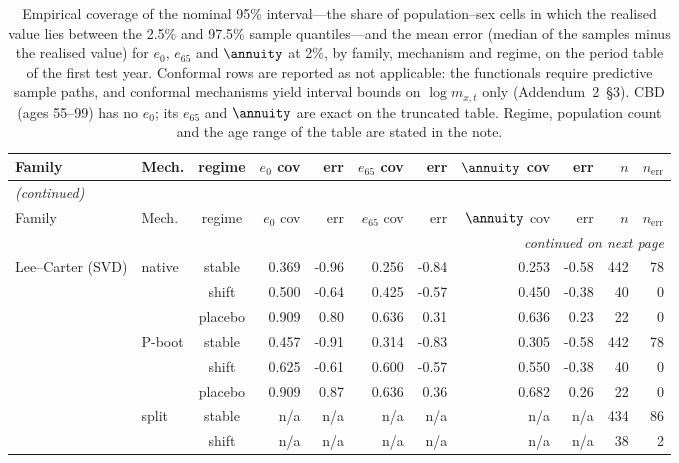 {\footnotesize\setlength{\tabcolsep}{2.5pt}
\begin{longtable}{@{}llcrrrrrrrr@{}}
\caption{Empirical coverage of the nominal 95\% interval---the share of population--sex cells in which the realised value lies between the 2.5\% and 97.5\% sample quantiles---and the mean error (median of the samples minus the realised value) for $e_0$, $e_{65}$ and $\annuity$ at 2\%, by family, mechanism and regime, on the period table of the first test year. Conformal rows are reported as not applicable: the functionals require predictive sample paths, and conformal mechanisms yield interval bounds on $\log m_{x,t}$ only (Addendum~2~\S3). CBD (ages 55--99) has no $e_0$; its $e_{65}$ and $\annuity$ are exact on the truncated table. Regime, population count and the age range of the table are stated in the note.}\label{tab:h5-actuarial} \\
\toprule
Family & Mech. & regime & $e_0$ cov & err & $e_{65}$ cov & err & $\annuity$ cov & err & $n$ & $n_{\mathrm{err}}$ \\
\midrule
\endfirsthead
\multicolumn{11}{l}{\emph{(continued)}} \\
\toprule
Family & Mech. & regime & $e_0$ cov & err & $e_{65}$ cov & err & $\annuity$ cov & err & $n$ & $n_{\mathrm{err}}$ \\
\midrule
\endhead
\midrule \multicolumn{11}{r}{\emph{continued on next page}} \\
\endfoot
\bottomrule
\endlastfoot
Lee--Carter (SVD) & native & stable & 0.369 & -0.96 & 0.256 & -0.84 & 0.253 & -0.58 & 442 & 78 \\
 &  & shift & 0.500 & -0.64 & 0.425 & -0.57 & 0.450 & -0.38 & 40 & 0 \\
 &  & placebo & 0.909 & 0.80 & 0.636 & 0.31 & 0.636 & 0.23 & 22 & 0 \\
 & P-boot & stable & 0.457 & -0.91 & 0.314 & -0.83 & 0.305 & -0.58 & 442 & 78 \\
 &  & shift & 0.625 & -0.61 & 0.600 & -0.57 & 0.550 & -0.38 & 40 & 0 \\
 &  & placebo & 0.909 & 0.87 & 0.636 & 0.36 & 0.682 & 0.26 & 22 & 0 \\
 & split & stable & n/a & n/a & n/a & n/a & n/a & n/a & 434 & 86 \\
 &  & shift & n/a & n/a & n/a & n/a & n/a & n/a & 38 & 2 \\

\end{longtable}}
